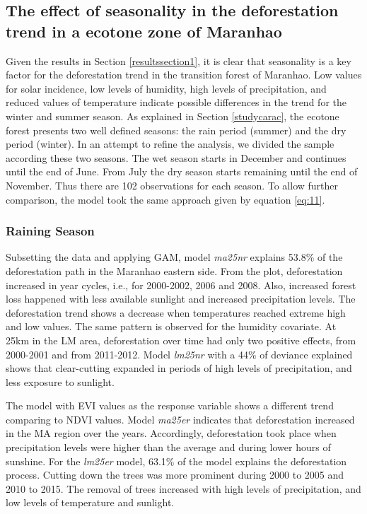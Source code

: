 \subsection{The effect of seasonality in the deforestation trend in a ecotone zone of Maranhao} \label{resultssection2}

Given the results in Section \ref{resultssection1}, it is clear that seasonality is a key factor for the deforestation trend in the transition forest of Maranhao. Low values for solar incidence, low levels of humidity, high levels of precipitation, and reduced values of temperature indicate possible differences in the trend for the winter and summer season. As explained in Section \ref{studycarac}, the ecotone forest presents two well defined seasons: the rain period (summer) and the dry period (winter). In an attempt to refine the analysis, we divided the sample according these two seasons. The wet season starts in December and continues until the end of June. From July the dry season starts remaining until the end of November. Thus there are 102 observations for each season. To allow further comparison, the model took the same approach given by equation \ref{eq:11}. 

\subsubsection{Raining Season}
Subsetting the data and applying GAM, model \textit{ma25nr} explains 53.8\% of the deforestation path in the Maranhao eastern side. From the plot, deforestation increased in year cycles, i.e., for 2000-2002, 2006 and 2008. Also, increased forest loss happened with less available sunlight and increased precipitation levels. The deforestation trend shows a decrease when temperatures reached extreme high and low values. The same pattern is observed for the humidity covariate. At 25km in the LM area, deforestation over time had only two positive effects, from 2000-2001 and from 2011-2012. Model \textit{lm25nr} with a 44\% of deviance explained shows that clear-cutting expanded in periods of high levels of precipitation, and less exposure to sunlight. 

The model with EVI values as the response variable shows a different trend comparing to NDVI values. Model \textit{ma25er} indicates that deforestation increased in the MA region over the years. Accordingly, deforestation took place when precipitation levels were higher than the average and during lower hours of sunshine. For the \textit{lm25er} model, 63.1\% of the model explains the deforestation process. Cutting down the trees was more prominent during 2000 to 2005 and 2010 to 2015. The removal of trees increased with high levels of precipitation, and low levels of temperature and sunlight. 

